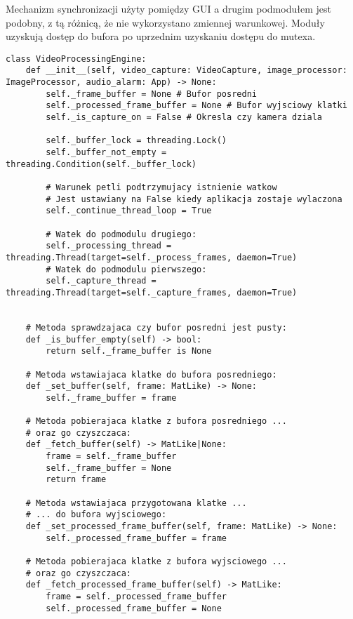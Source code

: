 Mechanizm synchronizacji użyty pomiędzy GUI a drugim podmodułem jest podobny, z tą różnicą, że nie wykorzystano zmiennej warunkowej. Moduły uzyskują dostęp do bufora po uprzednim uzyskaniu dostępu do mutexa. 


\begin{lstlisting}[caption={Kod modułu silnika przetwarzania wideo z zawartymi mechanizami synchronizacji}, label={lst:engine-1}]
class VideoProcessingEngine:
    def __init__(self, video_capture: VideoCapture, image_processor: ImageProcessor, audio_alarm: App) -> None:
        self._frame_buffer = None # Bufor posredni
        self._processed_frame_buffer = None # Bufor wyjsciowy klatki
        self._is_capture_on = False # Okresla czy kamera dziala

        self._buffer_lock = threading.Lock()
        self._buffer_not_empty = threading.Condition(self._buffer_lock)

        # Warunek petli podtrzymujacy istnienie watkow 
        # Jest ustawiany na False kiedy aplikacja zostaje wylaczona
        self._continue_thread_loop = True

        # Watek do podmodulu drugiego:
        self._processing_thread = threading.Thread(target=self._process_frames, daemon=True)
        # Watek do podmodulu pierwszego:
        self._capture_thread = threading.Thread(target=self._capture_frames, daemon=True)
        

    # Metoda sprawdzajaca czy bufor posredni jest pusty:
    def _is_buffer_empty(self) -> bool:
        return self._frame_buffer is None 
    
    # Metoda wstawiajaca klatke do bufora posredniego:
    def _set_buffer(self, frame: MatLike) -> None:
        self._frame_buffer = frame
    
    # Metoda pobierajaca klatke z bufora posredniego ... 
    # oraz go czyszczaca:
    def _fetch_buffer(self) -> MatLike|None:
        frame = self._frame_buffer
        self._frame_buffer = None
        return frame

    # Metoda wstawiajaca przygotowana klatke ... 
    # ... do bufora wyjsciowego:
    def _set_processed_frame_buffer(self, frame: MatLike) -> None:
        self._processed_frame_buffer = frame

    # Metoda pobierajaca klatke z bufora wyjsciowego ... 
    # oraz go czyszczaca:
    def _fetch_processed_frame_buffer(self) -> MatLike:
        frame = self._processed_frame_buffer
        self._processed_frame_buffer = None


\end{lstlisting}
